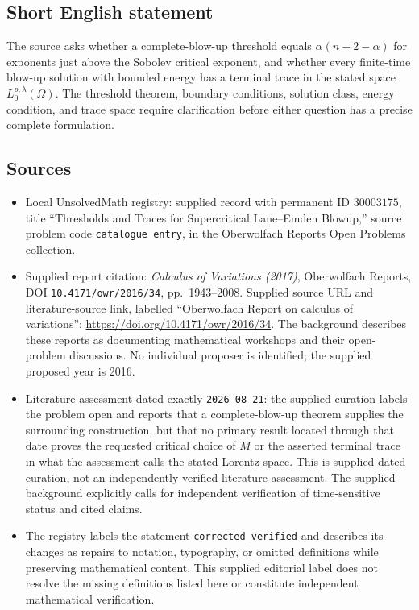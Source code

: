 \documentclass[11pt]{article}
\begin{document}
\subsection{Short English statement}
The source asks whether a complete-blow-up threshold equals \(\alpha(n-2-\alpha)\) for exponents just above the Sobolev critical exponent, and whether every finite-time blow-up solution with bounded energy has a terminal trace in the stated space \(L^{p,\lambda}_0(\Omega)\). The threshold theorem, boundary conditions, solution class, energy condition, and trace space require clarification before either question has a precise complete formulation.
\subsection{Sources}
\begin{itemize}
\item Local UnsolvedMath registry: supplied record with permanent ID \(30003175\), title ``Thresholds and Traces for Supercritical Lane--Emden Blowup,'' source problem code \texttt{catalogue entry}, in the Oberwolfach Reports Open Problems collection.
\item Supplied report citation: \emph{Calculus of Variations (2017)}, Oberwolfach Reports, DOI \texttt{10.4171/owr/2016/34}, pp.~1943--2008. Supplied source URL and literature-source link, labelled ``Oberwolfach Report on calculus of variations'': \url{https://doi.org/10.4171/owr/2016/34}. The background describes these reports as documenting mathematical workshops and their open-problem discussions. No individual proposer is identified; the supplied proposed year is 2016.
\item Literature assessment dated exactly \texttt{2026-08-21}: the supplied curation labels the problem open and reports that a complete-blow-up theorem supplies the surrounding construction, but that no primary result located through that date proves the requested critical choice of \(M\) or the asserted terminal trace in what the assessment calls the stated Lorentz space. This is supplied dated curation, not an independently verified literature assessment. The supplied background explicitly calls for independent verification of time-sensitive status and cited claims.
\item The registry labels the statement \texttt{corrected\_verified} and describes its changes as repairs to notation, typography, or omitted definitions while preserving mathematical content. This supplied editorial label does not resolve the missing definitions listed here or constitute independent mathematical verification.
\end{itemize}
\end{document}
